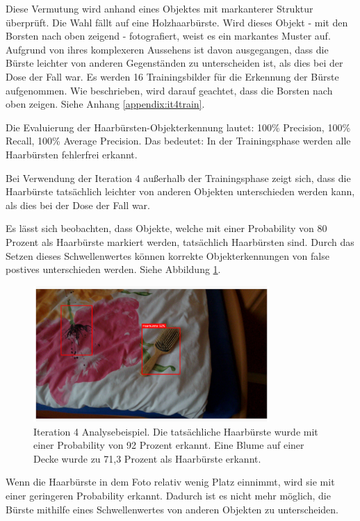Diese Vermutung wird anhand eines Objektes mit markanterer Struktur überprüft. Die Wahl fällt auf eine Holzhaarbürste. Wird dieses Objekt - mit den Borsten nach oben zeigend - fotografiert, weist es ein markantes Muster auf. Aufgrund von ihres komplexeren Aussehens ist davon ausgegangen, dass die Bürste leichter von anderen Gegenständen zu unterscheiden ist, als dies bei der Dose der Fall war. Es werden 16 Trainingsbilder für die Erkennung der Bürste aufgenommen. Wie beschrieben, wird darauf geachtet, dass die Borsten nach oben zeigen. Siehe Anhang \ref{appendix:it4train}.

Die Evaluierung der Haarbürsten-Objekterkennung lautet: 100\% Precision, 100\% Recall, 100\% Average Precision. Das bedeutet: In der Trainingsphase werden alle Haarbürsten fehlerfrei erkannt. 

Bei Verwendung der Iteration 4 außerhalb der Trainingsphase zeigt sich, dass die Haarbürste tatsächlich leichter von anderen Objekten unterschieden werden kann, als dies bei der Dose der Fall war.

Es lässt sich beobachten, dass Objekte, welche mit einer Probability von 80 Prozent als Haarbürste markiert werden, tatsächlich Haarbürsten sind. Durch das Setzen dieses Schwellenwertes können korrekte Objekterkennungen von false postives unterschieden werden. Siehe Abbildung \ref{img:it4}.

\begin{figure}[H]
	\centering
	\includegraphics[width=0.8\textwidth]{images/it4notpretty.png}
	\caption[Iteration 4 Analysebeispiel]{Iteration 4 Analysebeispiel. Die tatsächliche Haarbürste wurde mit einer Probability von 92 Prozent erkannt. Eine Blume auf einer Decke wurde zu 71,3 Prozent als Haarbürste erkannt.}
	\label{img:it4}
\end{figure}

Wenn die Haarbürste in dem Foto relativ wenig Platz einnimmt, wird sie mit einer geringeren Probability erkannt. Dadurch ist es nicht mehr möglich, die Bürste mithilfe eines Schwellenwertes von anderen Objekten zu unterscheiden.

